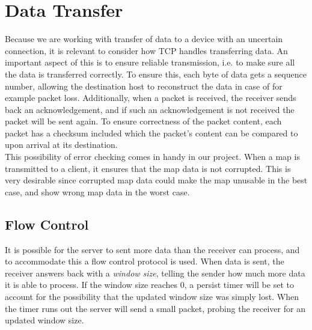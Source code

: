 \section{Data Transfer}
Because we are working with transfer of data to a device with an uncertain connection, it is relevant to consider how TCP handles transferring data. An important aspect of this is to ensure reliable transmission, i.e. to make sure all the data is transferred correctly. To ensure this, each byte of data gets a sequence number, allowing the destination host to reconstruct the data in case of for example packet loss. Additionally, when a packet is received, the receiver sends back an acknowledgement, and if such an acknowledgement is not received the packet will be sent again. To ensure correctness of the packet content, each packet has a checksum included which the packet's content can be compared to upon arrival at its destination.\\

This possibility of error checking comes in handy in our project. When a map is transmitted to a client, it ensures that the map data is not corrupted. This is very desirable since corrupted map data could make the map unusable in the best case, and show wrong map data in the worst case.

\subsection{Flow Control}
It is possible for the server to sent more data than the receiver can process, and to accommodate this a flow control protocol is used. When data is sent, the receiver answers back with a \textit{window size}, telling the sender how much more data it is able to process. If the window size reaches 0, a persist timer will be set to account for the possibility that the updated window size was simply lost. When the timer runs out the server will send a small packet, probing the receiver for an updated window size.



